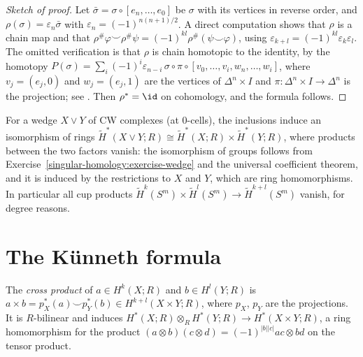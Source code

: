 \begin{proof}[Sketch of proof]
Let $\bar\sigma = \sigma \circ [e_n, \ldots, e_0]$ be $\sigma$ with its vertices in reverse order, and $\rho(\sigma) = \varepsilon_n\bar\sigma$ with $\varepsilon_n = (-1)^{n(n+1)/2}$.
A direct computation shows that $\rho$ is a chain map and that
$\rho^\#\varphi \smile \rho^\#\psi = (-1)^{kl}\rho^\#(\psi \smile \varphi)$, using $\varepsilon_{k+l} = (-1)^{kl}\varepsilon_k\varepsilon_l$. The omitted verification is that $\rho$ is
chain homotopic to the identity, by the homotopy $P(\sigma) = \sum_i (-1)^i\varepsilon_{n-i}\,\sigma \circ \pi \circ [v_0, \ldots, v_i, w_n, \ldots, w_i]$, where
$v_j = (e_j, 0)$ and $w_j = (e_j, 1)$ are the vertices of $\Delta^n \times I$ and $\pi \colon \Delta^n \times I \to \Delta^n$ is the projection; see
\cite[Theorem 3.14]{hatcher-at}. Then $\rho^* = \id$ on cohomology, and the formula follows.
\end{proof}

\begin{example}\label{singular-homology:example-wedge-ring}
For a wedge $X \vee Y$ of CW complexes (at $0$-cells), the inclusions induce an isomorphism of rings
$\tilde{H}^*(X \vee Y; R) \cong \tilde{H}^*(X; R) \times \tilde{H}^*(Y; R)$, where products between the two factors vanish: the isomorphism of groups follows from
Exercise~\ref{singular-homology:exercise-wedge} and the universal coefficient theorem, and it is induced by the restrictions to $X$ and $Y$, which are ring homomorphisms.
In particular all cup products $\tilde{H}^k(S^m) \times \tilde{H}^l(S^m) \to \tilde{H}^{k+l}(S^m)$ vanish, for degree reasons.
\end{example}

\section{The K\"unneth formula}\label{singular-homology:section-kunneth}

\begin{definition}\label{singular-homology:definition-cross-product}
The \emph{cross product} of $a \in H^k(X; R)$ and $b \in H^l(Y; R)$ is $a \times b = p_X^*(a) \smile p_Y^*(b) \in H^{k+l}(X \times Y; R)$, where $p_X$, $p_Y$ are the
projections. It is $R$-bilinear and induces $H^*(X; R) \otimes_R H^*(Y; R) \to H^*(X \times Y; R)$, a ring homomorphism for the product
$(a \otimes b)(c \otimes d) = (-1)^{|b||c|}ac \otimes bd$ on the tensor product.
\end{definition}

